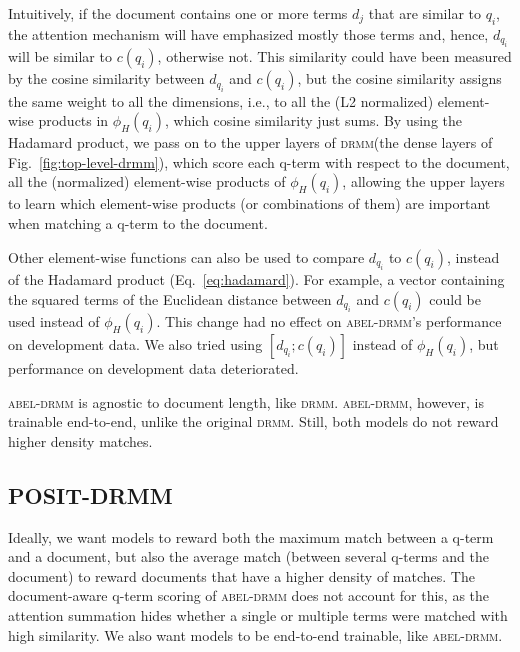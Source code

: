 \documentclass[11pt,a4paper]{article}
\newcommand{\drmm}{\textsc{drmm}\xspace}
\newcommand{\abeldrmm}{\textsc{abel-drmm}\xspace}
\begin{document}
Intuitively, if the document contains one or more terms $d_j$ that are similar to $q_i$, the attention mechanism will have emphasized mostly those terms and, hence, $d_{q_i}$ will be similar to $c(q_i)$, otherwise not. This similarity could have been measured by 
the cosine similarity between $d_{q_i}$ and $c(q_i)$, but the 
cosine similarity assigns the same weight to all the dimensions, i.e., to all the 
(L2 normalized) element-wise products in $\phi_{H}(q_i)$, which 
cosine similarity just sums. By using the Hadamard product, we pass on to the upper layers of \drmm (the dense layers of Fig.~\ref{fig:top-level-drmm}), which score each q-term with respect to the document, all the 
(normalized) element-wise products of $\phi_H(q_i)$, allowing the upper layers to learn which element-wise products (or combinations of them) are important when matching a q-term to the document.

Other element-wise functions can also be used to compare $d_{q_i}$ to $c(q_i)$, instead of the Hadamard product (Eq.~\ref{eq:hadamard}). For example, a vector containing the squared terms of the Euclidean distance between $d_{q_i}$ and $c(q_i)$ could be used instead of $\phi_H(q_i)$. This change had no effect on \abeldrmm's performance on development data. We also tried using $[d_{q_i};c(q_i)]$ instead of $\phi_{H}(q_i)$, but performance on development data deteriorated. 

\abeldrmm is agnostic to document length, like \drmm. 
\abeldrmm, however, is trainable end-to-end, unlike the original \drmm. 
Still, both models do not reward higher density matches. 



\subsection{POSIT-DRMM}
\label{sec:ps-drmm}
\label{sec:posit-drmm}

Ideally, we want models to reward both the maximum match between a q-term and a document, but also the average 
match (between several q-terms and the document) to reward documents that have a higher density of matches. The document-aware q-term scoring of \abeldrmm does not account for this, as the attention summation hides whether a single or multiple terms were matched with high similarity. We also want models to be 
end-to-end trainable, like \abeldrmm.
\end{document}
